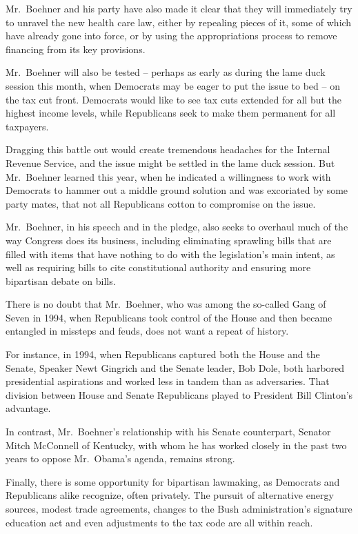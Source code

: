 ﻿\documentclass[12pt]{article}
\begin{document}
Mr.~Boehner and his party have also made it clear that they will immediately try to unravel the new
health care law, either by repealing pieces of it, some of which have already gone into force, or by
using the appropriations process to remove financing from its key provisions.

Mr.~Boehner will also be tested -- perhaps as early as during the lame duck session this month, when
Democrats may be eager to put the issue to bed -- on the tax cut front. Democrats would like to see
tax cuts extended for all but the highest income levels, while Republicans seek to make them
permanent for all taxpayers.

Dragging this battle out would create tremendous headaches for the Internal Revenue Service, and the
issue might be settled in the lame duck session. But Mr.~Boehner learned this year, when he
indicated a willingness to work with Democrats to hammer out a middle ground solution and was
excoriated by some party mates, that not all Republicans cotton to compromise on the issue.

Mr.~Boehner, in his speech and in the pledge, also seeks to overhaul much of the way Congress does
its business, including eliminating sprawling bills that are filled with items that have nothing to
do with the legislation's main intent, as well as requiring bills to cite constitutional authority
and ensuring more bipartisan debate on bills.

There is no doubt that Mr.~Boehner, who was among the so-called Gang of Seven in 1994, when
Republicans took control of the House and then became entangled in missteps and feuds, does not want
a repeat of history.

For instance, in 1994, when Republicans captured both the House and the Senate, Speaker Newt
Gingrich and the Senate leader, Bob Dole, both harbored presidential aspirations and worked less in
tandem than as adversaries. That division between House and Senate Republicans played to President
Bill Clinton's advantage.

In contrast, Mr.~Boehner's relationship with his Senate counterpart, Senator Mitch McConnell of
Kentucky, with whom he has worked closely in the past two years to oppose Mr.~Obama's agenda,
remains strong.

Finally, there is some opportunity for bipartisan lawmaking, as Democrats and Republicans alike
recognize, often privately. The pursuit of alternative energy sources, modest trade agreements,
changes to the Bush administration's signature education act and even adjustments to the tax code
are all within reach.
\end{document}
